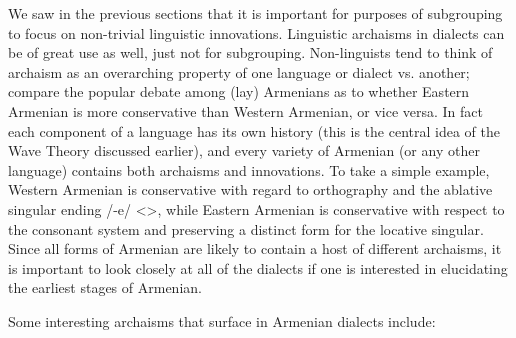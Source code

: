 \documentclass[output=paper]{langscibook}
\begin{document}
\label{sec:vaux:theory:diac:sub:arch}
We saw in the previous sections that it is important for purposes of subgrouping to focus on non-trivial linguistic innovations. Linguistic archaisms in dialects can be of great use as well, just not for subgrouping. Non-linguists tend to think of archaism as an overarching property of one language or dialect vs. another; compare the popular debate among (lay) Armenians as to whether Eastern Armenian is more conservative than Western Armenian, or vice versa. In fact each component of a language has its own history (this is the central idea of the Wave Theory discussed earlier), and every variety of Armenian (or any other language) contains both archaisms and innovations. To take a simple example, Western Armenian is conservative with regard to orthography and the ablative singular ending /-e/  <>, while Eastern Armenian is conservative with respect to the consonant system and preserving a distinct form for the locative singular. Since all forms of Armenian are likely to contain a host of different archaisms, it is important to look closely at all of the dialects if one is interested in elucidating the earliest stages of Armenian.

Some interesting archaisms that surface in Armenian dialects include:
\end{document}
